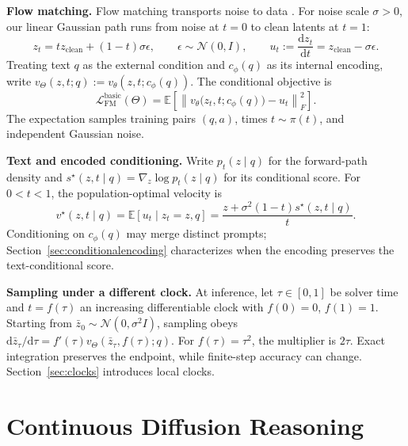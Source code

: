 \documentclass{article}
\newcommand{\E}{\mathbb{E}}
\newcommand{\rev}[1]{{\color{blue}#1}}
\begin{document}
\textbf{Flow matching.}
Flow matching transports noise to data \citep{flowmatching}. For noise scale $\sigma>0$, our linear Gaussian path runs from noise at $t=0$ to clean latents at $t=1$:
\begin{equation}
 z_t=t z_{\mathrm{clean}}+(1-t)\sigma\epsilon,
 \qquad \epsilon\sim\mathcal N(0,I),\qquad
 u_t:=\frac{\mathrm d z_t}{\mathrm d t}=z_{\mathrm{clean}}-\sigma\epsilon.
 \label{eq:methodinterpolant}
\end{equation}
Treating text $q$ as the external condition and $c_\phi(q)$ as its internal encoding, write $v_\Theta(z,t;q):=v_\theta(z,t;c_\phi(q))$. The conditional objective is
\begin{equation}
 \mathcal L_{\mathrm{FM}}^{\mathrm{basic}}(\Theta)
 =\E\!\left[\left\|v_\theta\bigl(z_t,t;c_\phi(q)\bigr)-u_t\right\|_F^2\right].
 \label{eq:basicflowloss}
\end{equation}
The expectation samples training pairs $(q,a)$, times $t\sim\pi(t)$, and independent Gaussian noise.

\textbf{Text and encoded conditioning.}
Write $p_t(z\mid q)$ for the forward-path density and $s^\star(z,t\mid q)=\nabla_z\log p_t(z\mid q)$ for its conditional score. For $0<t<1$, the population-optimal velocity is
\begin{equation}
 v^\star(z,t\mid q)
 =\E[u_t\mid z_t=z,q]
 =\frac{z+\sigma^2(1-t)s^\star(z,t\mid q)}{t}.
 \label{eq:conditionalflowscore}
\end{equation}
Conditioning on $c_\phi(q)$ may merge distinct prompts; Section~\ref{sec:conditionalencoding} characterizes when the encoding preserves the text-conditional score.

\textbf{Sampling under a different clock.}
At inference, let $\tau\in[0,1]$ be solver time and $t=f(\tau)$ an increasing differentiable clock with $f(0)=0$, $f(1)=1$. Starting from $\bar z_0\sim\mathcal N(0,\sigma^2I)$, sampling obeys $\mathrm d\bar z_\tau/\mathrm d\tau=f'(\tau)v_\Theta(\bar z_\tau,f(\tau);q)$. For $f(\tau)=\tau^2$, the multiplier is $2\tau$. Exact integration preserves the endpoint, while finite-step accuracy can change. \rev{Section~\ref{sec:clocks} introduces local clocks.}

\section{Continuous Diffusion Reasoning}
\label{sec:methodology}
\label{sec:methodflow}
\end{document}
